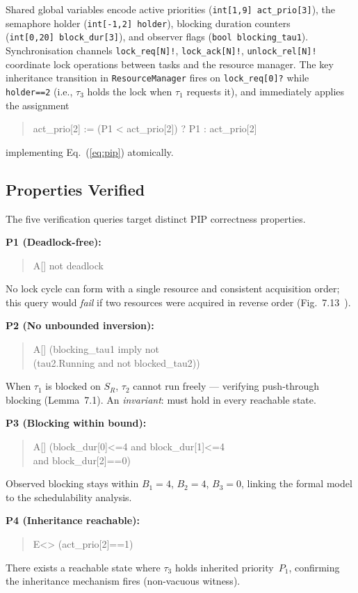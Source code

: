 \documentclass[conference]{IEEEtran}
\begin{document}
Shared global variables encode active priorities
(\texttt{int[1,9]~act\_prio[3]}), the semaphore holder
(\texttt{int[-1,2]~holder}), blocking duration counters
(\texttt{int[0,20]~block\_dur[3]}), and observer flags
(\texttt{bool~blocking\_tau1}).
Synchronisation channels \texttt{lock\_req[N]!}, \texttt{lock\_ack[N]!},
\texttt{unlock\_rel[N]!} coordinate lock operations between tasks and
the resource manager.
The key inheritance transition in \texttt{ResourceManager} fires on
\texttt{lock\_req[0]?} while \texttt{holder==2} (i.e., $\tau_3$ holds
the lock when $\tau_1$ requests it), and immediately applies the
assignment
\begin{quote}\small\ttfamily
act\_prio[2] := (P1 < act\_prio[2]) ? P1 : act\_prio[2]
\end{quote}
implementing Eq.~(\ref{eq:pip}) atomically.

\subsection{Properties Verified}

The five verification queries target distinct PIP correctness properties.

\textbf{P1 (Deadlock-free):}
\begin{quote}\small\ttfamily
A[] not deadlock
\end{quote}
No lock cycle can form with a single resource and consistent acquisition order;
this query would \emph{fail} if two resources were acquired in reverse order
(Fig.~7.13~\cite{Buttazzo2011}).

\textbf{P2 (No unbounded inversion):}
\begin{quote}\small\ttfamily
A[] (blocking\_tau1 imply not\\
\quad(tau2.Running and not blocked\_tau2))
\end{quote}
When $\tau_1$ is blocked on $S_R$, $\tau_2$ cannot run freely — verifying
push-through blocking (Lemma~7.1). An \emph{invariant}: must hold in every
reachable state.

\textbf{P3 (Blocking within bound):}
\begin{quote}\small\ttfamily
A[] (block\_dur[0]<=4 and block\_dur[1]<=4\\
\quad and block\_dur[2]==0)
\end{quote}
Observed blocking stays within $B_1{=}4$, $B_2{=}4$, $B_3{=}0$, linking
the formal model to the schedulability analysis.

\textbf{P4 (Inheritance reachable):}
\begin{quote}\small\ttfamily
E<> (act\_prio[2]==1)
\end{quote}
There exists a reachable state where $\tau_3$ holds inherited priority~$P_1$,
confirming the inheritance mechanism fires (non-vacuous witness).
\end{document}

